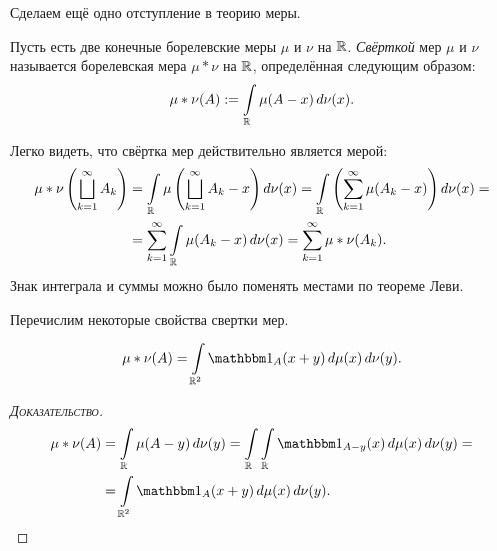 \documentclass[../main.tex]{subfiles}
\begin{document}
Сделаем ещё одно отступление в теорию меры.

\begin{df}
 Пусть есть две конечные борелевские меры $ \mu $ и $ \nu $ на $ \mathbb{R} $. \textit{Свёрткой} мер $ \mu $ и $ \nu $ называется борелевская мера $ \mu \ast \nu $ на $ \mathbb{R} $, определённая следующим образом:
 \begin{align*}
  \mu \ast \nu(A) := \int\limits_{\mathbb{R}} \mu(A - x) \,d\nu(x).
 \end{align*} 
\end{df}
\begin{remrk*}
 Легко видеть, что свёртка мер действительно является мерой:
 \begin{align*}
  \mu\ast\nu \left( \bigsqcup_{k=1}^{\infty}A_k \right) &= \int\limits_{\mathbb{R}} \mu \left( \bigsqcup_{k=1}^{\infty}A_k - x \right) d\nu(x) = \int\limits_{\mathbb{R}} \left( \sum_{k=1}^{\infty} \mu(A_k - x) \right) d\nu(x) = \\
  &= \sum_{k=1}^{\infty} \int\limits_{\mathbb{R}} \mu(A_k - x) \,d\nu(x) = \sum_{k=1}^{\infty}\mu \ast \nu(A_k).
 \end{align*} Знак интеграла и суммы можно было поменять местами по теореме Леви.
\end{remrk*}

Перечислим некоторые свойства свертки мер.

\begin{prop}
 \begin{align}
  \label{equation:measure_convolution_double_integral}
  \mu\ast\nu(A) = \int\limits_{\R^{2}} \Ind_A(x + y)\,d\mu(x)\,d\nu(y).
 \end{align} 
\end{prop}
\begin{proof}[\normalfont\textsc{Доказательство}]
 \begin{align*}
  \mu\ast\nu(A)&=\int\limits_{\R} \mu(A-y)\,d\nu(y) = \int\limits_{\R} \int\limits_{\R} \Ind_{A-y}  (x)\,d\mu(x)\,d\nu(y) = \\
  &= \int\limits_{\R^{2}} \Ind_A(x+y)\,d\mu(x)\,d\nu(y). 
 \end{align*} 
\end{proof}
\end{document}
